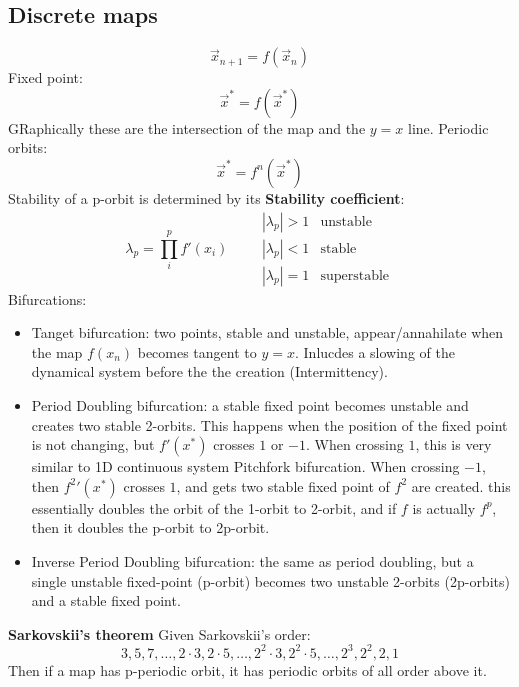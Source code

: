 \documentclass[twocolumn]{article}
\begin{document}
\subsection{Discrete maps}
\begin{equation}
    \vec{x}_{n+1} = f\left(\vec{x}_n\right)
\end{equation}
Fixed point:
\begin{equation}
    \vec{x}^* = f\left(\vec{x}^*\right)
\end{equation}
GRaphically these are the intersection of the map and the $y = x$ line.
\newline
Periodic orbits:
\begin{equation}
    \vec{x}^* = f^n\left(\vec{x}^*\right)
\end{equation}
Stability of a p-orbit is determined by its \textbf{Stability coefficient}:
\begin{equation}
    \lambda_p = \prod_i^p f'(x_i)
    \qquad
    \begin{matrix}
        \left|\lambda_p\right| > 1 & \text{unstable} \\
        \left|\lambda_p\right| < 1 & \text{stable} \\
        \left|\lambda_p\right| = 1 & \text{superstable}
    \end{matrix}
\end{equation}
Bifurcations:
\begin{itemize}
    \item Tanget bifurcation: two points, stable and unstable, appear/annahilate when the map $f(x_n)$ becomes tangent to $y = x$. Inlucdes a slowing of the dynamical system before the the creation (Intermittency).
    \item Period Doubling bifurcation: a stable fixed point becomes unstable and creates two stable 2-orbits.
    \newline
    This happens when the position of the fixed point is not changing, but $f'(x^*)$ crosses $1$ or $-1$. When crossing $1$, this is very similar to 1D continuous system Pitchfork bifurcation. When crossing $-1$, then $f^{2}{'}(x^*)$ crosses $1$, and gets two stable fixed point of $f^2$ are created. this essentially doubles the orbit of the 1-orbit to 2-orbit, and if $f$ is actually $f^p$, then it doubles the p-orbit to 2p-orbit.
    \item Inverse Period Doubling bifurcation: the same as period doubling, but a single unstable fixed-point (p-orbit) becomes two unstable 2-orbits (2p-orbits) and a stable fixed point.
\end{itemize}
\textbf{Sarkovskii's theorem}
\newline
Given Sarkovskii's order:
\begin{equation}
    3,5,7,\dots,2\cdot3,2\cdot5,\dots,2^2\cdot3,2^2\cdot5,\dots,2^3,2^2,2,1
\end{equation}
Then if a map has p-periodic orbit, it has periodic orbits of all order above it.
\end{document}

